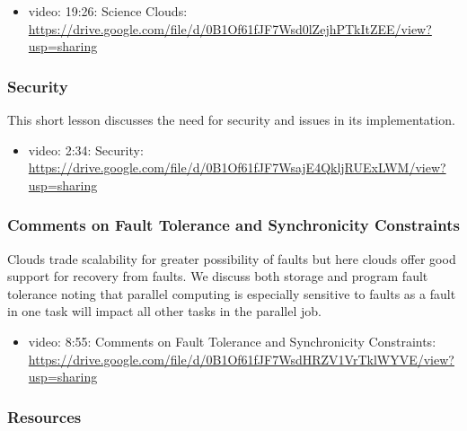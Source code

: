\begin{itemize}
\tightlist
\item
  video: 19:26: Science Clouds:
  \url{https://drive.google.com/file/d/0B1Of61fJF7Wsd0lZejhPTkItZEE/view?usp=sharing}
\end{itemize}

\subsubsection{Security}\label{security}

This short lesson discusses the need for security and issues in its
implementation.

\begin{itemize}
\tightlist
\item
  video: 2:34: Security:
  \url{https://drive.google.com/file/d/0B1Of61fJF7WsajE4QkljRUExLWM/view?usp=sharing}
\end{itemize}

\subsubsection{Comments on Fault Tolerance and Synchronicity
Constraints}\label{comments-on-fault-tolerance-and-synchronicity-constraints}

Clouds trade scalability for greater possibility of faults but here
clouds offer good support for recovery from faults. We discuss both
storage and program fault tolerance noting that parallel computing is
especially sensitive to faults as a fault in one task will impact all
other tasks in the parallel job.

\begin{itemize}
\tightlist
\item
  video: 8:55: Comments on Fault Tolerance and Synchronicity
  Constraints:
  \url{https://drive.google.com/file/d/0B1Of61fJF7WsdHRZV1VrTklWYVE/view?usp=sharing}
\end{itemize}

\subsubsection{Resources}\label{resources-3}

